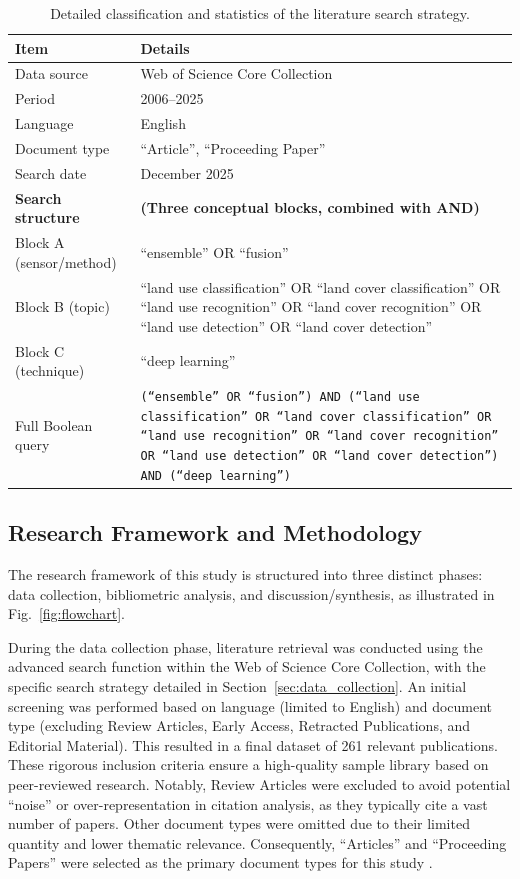 \documentclass[]{interact}
\theoremstyle{plain}%
\theoremstyle{definition}
\theoremstyle{remark}
\begin{document}
\begin{table}[htb!]
	\centering
	\setlength{\belowcaptionskip}{5pt}
	\caption{Detailed classification and statistics of the literature search strategy.}
	\label{tab:search_strategy}
	\small 
	\renewcommand{\arraystretch}{1.4}
	\begin{tabular}{@{} p{4.5cm} p{10cm} @{}} 
		\toprule
		\textbf{Item} & \textbf{Details} \\
		\midrule
		Data source & Web of Science Core Collection \\
		Period & 2006--2025 \\
		Language & English \\
		Document type & ``Article'', ``Proceeding Paper'' \\
		Search date & December 2025 \\
		\midrule
		\textbf{Search structure} & \textbf{(Three conceptual blocks, combined with AND)} \\
		Block A (sensor/method) & ``ensemble'' OR ``fusion'' \\
		Block B (topic) & ``land use classification'' OR ``land cover classification'' OR ``land use recognition'' OR ``land cover recognition'' OR ``land use detection'' OR ``land cover detection'' \\
		Block C (technique) & ``deep learning'' \\
		\midrule
		Full Boolean query & \parbox{10cm}{\texttt{(``ensemble'' OR ``fusion'') AND (``land use classification'' OR ``land cover classification'' OR ``land use recognition'' OR ``land cover recognition'' OR ``land use detection'' OR ``land cover detection'') AND (``deep learning'')}} \\
		\bottomrule
	\end{tabular}
\end{table}


\subsection{Research Framework and Methodology}
\label{sec:methodology}

The research framework of this study is structured into three distinct phases: data collection, bibliometric analysis, and discussion/synthesis, as illustrated in Fig.~\ref{fig:flowchart}. 

During the data collection phase, literature retrieval was conducted using the advanced search function within the Web of Science Core Collection, with the specific search strategy detailed in Section~\ref{sec:data_collection}. An initial screening was performed based on language (limited to English) and document type (excluding Review Articles, Early Access, Retracted Publications, and Editorial Material). This resulted in a final dataset of 261 relevant publications. These rigorous inclusion criteria ensure a high-quality sample library based on peer-reviewed research. Notably, Review Articles were excluded to avoid potential ``noise'' or over-representation in citation analysis, as they typically cite a vast number of papers. Other document types were omitted due to their limited quantity and lower thematic relevance. Consequently, ``Articles'' and ``Proceeding Papers'' were selected as the primary document types for this study \citep{ORIG12}.
\end{document}
